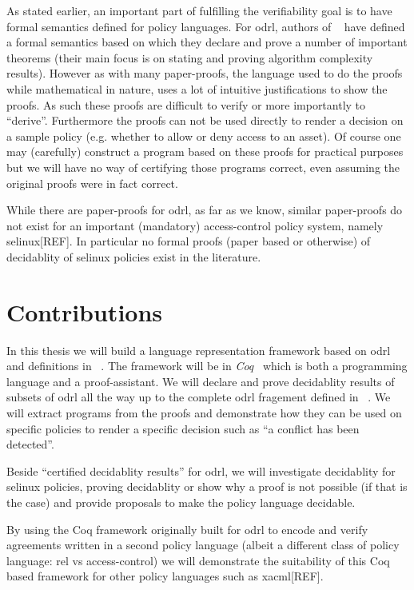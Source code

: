 As stated earlier, an important part of fulfilling the verifiability goal is to have formal semantics defined for policy languages. For \ac{odrl}, authors of ~\cite{pucella2006} have defined a formal semantics based on which they declare and prove a number of important theorems (their main focus is on stating and proving algorithm complexity results). However as with many paper-proofs, the language used to do the proofs while mathematical in nature, uses a lot of intuitive justifications to show the proofs. As such these proofs are difficult to verify or more importantly to ``derive''. Furthermore the proofs can not be used directly to render a decision on a sample policy (e.g. whether to allow or deny access to an asset). Of course one may (carefully) construct a program based on these proofs for practical purposes but we will have no way of certifying those programs correct, even assuming the original proofs were in fact correct.

While there are paper-proofs for \ac{odrl}, as far as we know, similar paper-proofs do not exist for an important (mandatory) access-control policy system, namely \ac{selinux}[REF]. In particular no formal proofs (paper based or otherwise) of decidablity of \ac{selinux} policies exist in the literature. 


\section{Contributions}

In this thesis we will build a language representation framework based on \ac{odrl} and definitions in ~\cite{pucella2006}. The framework will be in \emph{Coq}~\cite{coqref} which is both a programming language and a proof-assistant. We will declare and prove decidablity results of subsets of \ac{odrl} all the way up to the complete \ac{odrl} fragement defined in ~\cite{pucella2006}. We will extract programs from the proofs and demonstrate how they can be used on specific policies to render a specific decision such as ``a conflict has been detected''. 

Beside ``certified decidablity results'' for \ac{odrl}, we will investigate decidablity for \ac{selinux} policies, proving decidablity or show why a proof is not possible (if that is the case) and provide proposals to make the policy language decidable.

By using the Coq framework originally built for \ac{odrl} to encode and verify agreements written in a second policy language (albeit a different class of policy language: \ac{rel} vs access-control) we will demonstrate the suitability of this Coq based framework for other policy languages such as \ac{xacml}[REF].

